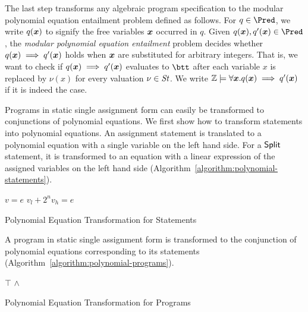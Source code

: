 
The last step transforms any algebraic program specification to the 
modular polynomial equation entailment problem defined as follows. For
$q \in \Pred$, we write $q(\vx)$ to signify the free variables $\vx$
occurred in $q$. Given $q(\vx), q'(\vx) \in \Pred$, the \emph{modular
  polynomial equation entailment} problem decides whether 
$q(\vx) \implies q'(\vx)$ holds when $\vx$ are substituted for
arbitrary integers. That is, we want to check if $q(\vx) \implies
q'(\vx)$ evaluates to $\btt$ after each variable $x$ is replaced by
$\nu(x)$ for every valuation $\nu \in \mathit{St}$. We write $\bbfZ \models
\forall \vx. q(\vx) \implies q'(\vx)$ if it is indeed the case.

Programs in static single assignment form can easily be transformed to
conjunctions of polynomial equations. We first show how to transform
statements into polynomial equations. An assignment statement is
translated to a polynomial equation with a single variable on the left
hand side. For a $\mbox{\textsf{Split}}$ statement, it is transformed to an
equation with a linear expression of the assigned variables on the
left hand side (Algorithm~\ref{algorithm:polynomial-statements}). 
\begin{algorithm}
  \begin{algorithmic}[1]
        \Return $v = e$
      \EndCase
        \Return $v_l + 2^n v_h = e$
      \EndCase
    \EndMatch
    \EndFunction
  \end{algorithmic}
  \caption{Polynomial Equation Transformation for Statements}
  \label{algorithm:polynomial-statements}
\end{algorithm}

A program in static single assignment form is transformed to the
conjunction of polynomial equations corresponding to its statements
(Algorithm~\ref{algorithm:polynomial-programs}). 

\begin{algorithm}
  \begin{algorithmic}[1]
      \Case{$\epsilon$} \Return $\top$ \EndCase
        \Return {} $\wedge$
      \EndCase
    \EndMatch
    \EndFunction
  \end{algorithmic}
  \caption{Polynomial Equation Transformation for Programs}
  \label{algorithm:polynomial-programs}
\end{algorithm}

